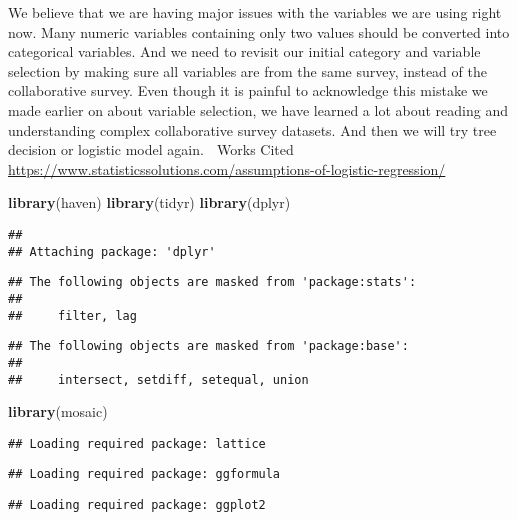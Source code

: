 \documentclass[]{article}
\newenvironment{Shaded}{\begin{snugshade}}{\end{snugshade}}
\newcommand{\KeywordTok}[1]{\textcolor[rgb]{0.13,0.29,0.53}{\textbf{#1}}}
\newcommand{\NormalTok}[1]{#1}
\begin{document}
We believe that we are having major issues with the variables we are
using right now. Many numeric variables containing only two values
should be converted into categorical variables. And we need to revisit
our initial category and variable selection by making sure all variables
are from the same survey, instead of the collaborative survey. Even
though it is painful to acknowledge this mistake we made earlier on
about variable selection, we have learned a lot about reading and
understanding complex collaborative survey datasets. And then we will
try tree decision or logistic model again.  Works Cited
\url{https://www.statisticssolutions.com/assumptions-of-logistic-regression/}

\begin{Shaded}
\begin{Highlighting}[]
\KeywordTok{library}\NormalTok{(haven)}
\KeywordTok{library}\NormalTok{(tidyr)}
\KeywordTok{library}\NormalTok{(dplyr)}
\end{Highlighting}
\end{Shaded}

\begin{verbatim}
## 
## Attaching package: 'dplyr'
\end{verbatim}

\begin{verbatim}
## The following objects are masked from 'package:stats':
## 
##     filter, lag
\end{verbatim}

\begin{verbatim}
## The following objects are masked from 'package:base':
## 
##     intersect, setdiff, setequal, union
\end{verbatim}

\begin{Shaded}
\begin{Highlighting}[]
\KeywordTok{library}\NormalTok{(mosaic)}
\end{Highlighting}
\end{Shaded}

\begin{verbatim}
## Loading required package: lattice
\end{verbatim}

\begin{verbatim}
## Loading required package: ggformula
\end{verbatim}

\begin{verbatim}
## Loading required package: ggplot2
\end{verbatim}
\end{document}
